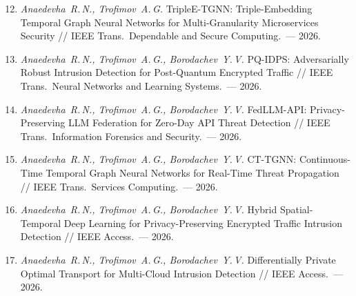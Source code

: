 \documentclass[12pt,a5paper]{article}
\begin{document}
\begin{enumerate}
\setcounter{enumi}{11}
\item \textit{Anaedevha~R.\,N., Trofimov~A.\,G.} TripleE-TGNN:
Triple-Embedding Temporal Graph Neural Networks for
Multi-Granularity Microservices Security // IEEE Trans.\
Dependable and Secure Computing.~--- 2026.

\item \textit{Anaedevha~R.\,N., Trofimov~A.\,G., Borodachev~Y.\,V.}
PQ-IDPS: Adversarially Robust Intrusion Detection for
Post-Quantum Encrypted Traffic // IEEE Trans.\ Neural
Networks and Learning Systems.~--- 2026.

\item \textit{Anaedevha~R.\,N., Trofimov~A.\,G., Borodachev~Y.\,V.}
FedLLM-API: Privacy-Preserving LLM Federation for Zero-Day
API Threat Detection // IEEE Trans.\ Information Forensics
and Security.~--- 2026.

\item \textit{Anaedevha~R.\,N., Trofimov~A.\,G., Borodachev~Y.\,V.}
CT-TGNN: Continuous-Time Temporal Graph Neural Networks
for Real-Time Threat Propagation // IEEE Trans.\ Services
Computing.~--- 2026.

\item \textit{Anaedevha~R.\,N., Trofimov~A.\,G., Borodachev~Y.\,V.}
Hybrid Spatial-Temporal Deep Learning for
Privacy-Preserving Encrypted Traffic Intrusion Detection //
IEEE Access.~--- 2026.

\item \textit{Anaedevha~R.\,N., Trofimov~A.\,G., Borodachev~Y.\,V.}
Differentially Private Optimal Transport for Multi-Cloud
Intrusion Detection // IEEE Access.~--- 2026.

\end{enumerate}
\end{document}

